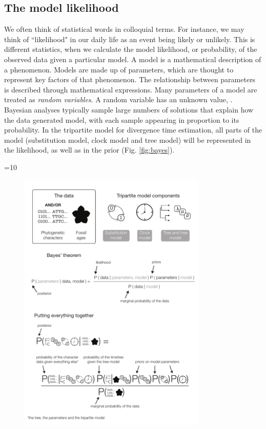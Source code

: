 \subsection{The model likelihood}

We often think of statistical words in colloquial terms.
For instance, we may think of ``likelihood" in our daily life as an event being likely or unlikely.
This is different  statistics, when we calculate the model likelihood, or probability, of the observed data given a particular model.
A model is a mathematical description of a phenomenon.
Models are made up of parameters, which are thought to represent key factors of that phenomenon.
The relationship between parameters is described through mathematical expressions.
Many parameters of a model are treated as \textit{random variables}.
A random variable has an unknown value, .
Bayesian analyses typically sample large numbers of solutions that explain how the data  generated  model, with each sample appearing in proportion to its probability.
In the tripartite model for divergence time estimation, all parts of the model (substitution model, clock model and tree model) will be represented in the likelihood, as well as in the prior (Fig. \ref{fig:bayes}).

\ifnum\value{num}=10{
\begin{figure}
\scriptsize
\centering
\includegraphics[width=0.8\textwidth]{Cambridge-Elements/manuscript.R3/submitted_figs/figure2}

\end{figure} }\else{}\fi

